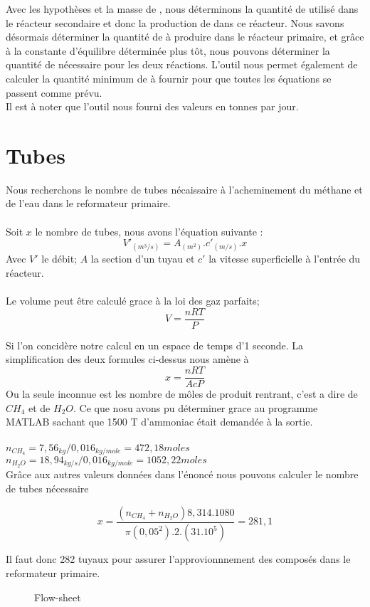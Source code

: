 \documentclass[a4paper, oneside, 12pt]{article}
\begin{document}
Avec les hypothèses et la masse de , nous déterminons la quantité de  
utilisé dans le réacteur secondaire et donc la production de  dans ce réacteur. Nous savons désormais 
déterminer la quantité de  à produire dans le réacteur primaire, et grâce à la constante d'équilibre déterminée 
plus tôt, nous pouvons déterminer la quantité de  nécessaire pour les deux réactions. L'outil nous permet également
de calculer la quantité minimum de  à fournir pour que toutes les équations se passent comme prévu. 
\\

Il est à noter que l'outil nous fourni des valeurs en tonnes par jour.

\section*{Tubes}
Nous recherchons le nombre de tubes nécaissaire à l'acheminement du méthane et de l'eau dans le reformateur primaire.\\
\\
Soit $x$ le nombre de tubes, nous avons l'équation suivante :
\[
V'_{(m^3/s)} = A_{(m^2)}. c'_{(m/s)} .x
\]
Avec $V'$ le débit; $A$ la section d'un tuyau et $c'$ la vitesse superficielle à l'entrée du réacteur.\\
\\
Le volume peut être calculé grace à la loi des gaz parfaits;
\[
V=\frac{nRT}{P}
\]

Si l'on concidère notre calcul en un espace de temps d'1 seconde. La simplification des deux formules ci-dessus nous amène à
\[
x=\frac{nRT}{AcP}
\]
Ou la seule inconnue est les nombre de môles de produit rentrant, c'est a dire de $CH_{4}$ et de $H_{2}O$. Ce que nosu avons pu déterminer grace au programme MATLAB sachant que 1500 T d'ammoniac était demandée à la sortie.\\
\\
$n_{CH_{4}}= 7,56_{kg} / 0,016_{kg/mole} = 472,18 moles$\\
$n_{H_{2}O}= 18,94_{kg/s}/ 0,016_{kg/mole} = 1052,22 moles$\\

Grâce aux autres valeurs données dans l'énoncé nous pouvons calculer le nombre de tubes nécessaire 


\[
x=\frac{(n_{CH_{4}}+n_{H_{2}O})8,314.1080}{\pi(0,05^2).2.(31.10^5)}=281,1
\]

Il faut donc 282 tuyaux pour assurer l'approvionnnement des composés dans le reformateur primaire.

\begin{figure}
	
	\caption{Flow-sheet}
\end{figure}
\end{document}
